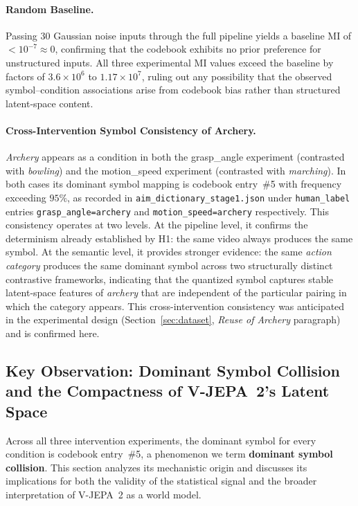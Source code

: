 \documentclass{article}
\begin{document}
\paragraph{Random Baseline.}
Passing 30 Gaussian noise inputs through the full pipeline yields a baseline
MI of $< 10^{-7} \approx 0$, confirming that the codebook exhibits no prior
preference for unstructured inputs.  All three experimental MI values exceed
the baseline by factors of $3.6 \times 10^{6}$ to $1.17 \times 10^{7}$,
ruling out any possibility that the observed symbol--condition associations
arise from codebook bias rather than structured latent-space content.

\paragraph{Cross-Intervention Symbol Consistency of Archery.}
\textit{Archery} appears as a condition in both the grasp\_angle
experiment (contrasted with \textit{bowling}) and the motion\_speed
experiment (contrasted with \textit{marching}).  In both cases its
dominant symbol mapping is codebook entry~\#5 with frequency exceeding
$95\%$, as recorded in \texttt{aim\_dictionary\_stage1.json} under
\texttt{human\_label} entries \texttt{grasp\_angle=archery} and
\texttt{motion\_speed=archery} respectively.
This consistency operates at two levels.  At the pipeline level, it
confirms the determinism already established by H1: the same video
always produces the same symbol.  At the semantic level, it provides
stronger evidence: the same \emph{action category} produces the same
dominant symbol across two structurally distinct contrastive frameworks,
indicating that the quantized symbol captures stable latent-space
features of \textit{archery} that are independent of the particular
pairing in which the category appears.  This cross-intervention
consistency was anticipated in the experimental design
(Section~\ref{sec:dataset}, \textit{Reuse of Archery} paragraph) and is confirmed here.

\subsection{Key Observation: Dominant Symbol Collision and the Compactness
            of V-JEPA~2's Latent Space}\label{sec:dominant_symbol}

Across all three intervention experiments, the dominant symbol for every
condition is codebook entry~\#5, a phenomenon we term \textbf{dominant symbol
collision}.  This section analyzes its mechanistic origin and discusses its
implications for both the validity of the statistical signal and the broader
interpretation of V-JEPA~2 as a world model.
\end{document}
